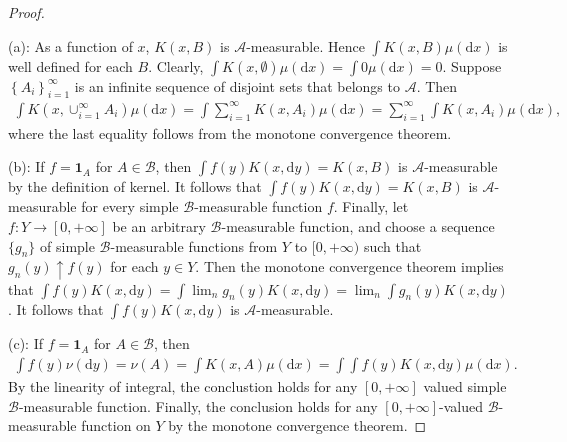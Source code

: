 \documentclass[11pt]{article}
\theoremstyle{plain}
\theoremstyle{definition}
\theoremstyle{remark}
\begin{document}
\begin{proof}
\

\noindent(a):
As a function of $x$, $K(x,B)$ is $\mathscr A$-measurable. 
Hence $\int K(x,B)\mu(\mathrm d x)$ is well defined for each $B$.
Clearly, $\int K(x,\emptyset )\mu(\mathrm d x) = \int 0 \mu (\mathrm d x) = 0$.
Suppose $\left\{ A_i \right\}_{i=1}^\infty$ is an infinite sequence of disjoint sets that belongs to $\mathscr A$.
Then
\begin{align*}
    \int K(x,\cup_{i=1}^\infty A_i )\mu(\mathrm d x) 
    =
    \int \sum_{i=1}^\infty K(x, A_i )\mu(\mathrm d x) 
    =
    \sum_{i=1}^\infty\int  K(x, A_i )\mu(\mathrm d x) ,
\end{align*}
where the last equality follows from the monotone convergence theorem.

\noindent(b):
If $f= \mathbf 1_A$ for $A\in \mathscr B$, then $\int f(y) K(x, \mathrm d y) = K(x,B)$ is $\mathscr A$-measurable by the definition of kernel.
It follows that $\int f(y) K(x, \mathrm d y) = K(x,B)$ is $\mathscr A$-measurable for every simple $\mathscr B$-measurable function $f$.
Finally, let $f: Y \to [0,+\infty]$ be an arbitrary $\mathscr B$-measurable function, and choose a sequence $\{g_n\}$ of simple $\mathscr B$-measurable functions from $Y$ to $[0,+\infty)$ such that $g_n(y) \uparrow f(y)$ for each $y\in Y$.
Then the monotone convergence theorem implies that
$
\int f(y) K(x, \mathrm d y)
=
\int \lim_n g_n(y) K(x, \mathrm d y)
=
\lim_n
\int  g_n(y) K(x, \mathrm d y)
$.
It follows that $\int f(y) K(x, \mathrm d y)$ is $\mathscr A$-measurable.

\noindent(c):
If $f= \mathbf 1_A$ for $A\in \mathscr B$, then 
\begin{align*}
    \int f(y) \nu (\mathrm d y)
    =
     \nu (A)
     =
     \int K(x,A) \mu (\mathrm d x)
 =
 \int \int f(y) K(x, \mathrm d y) \mu (\mathrm d x).
\end{align*}
By the linearity of integral, the conclustion holds for any $[0,+\infty ]$ valued simple $\mathscr B$-measurable function.
Finally, the conclusion holds for any $[0,+\infty ]$-valued $\mathscr B$-measurable function on $Y$ by the monotone convergence theorem.


\end{proof}
\end{document}
